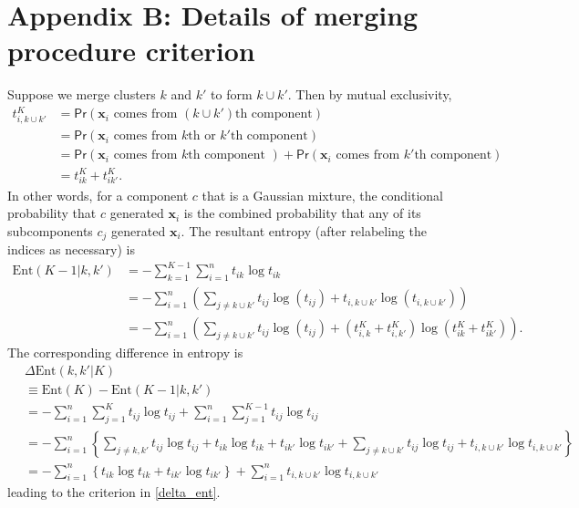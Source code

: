 \documentclass{uwstat572}
\newcommand*\ba{\[ \begin{aligned}}
\newcommand*\ea{\end{aligned} \]}
\newcommand*\bx{\mathbf{x}}
\renewcommand\;{\,}
\renewcommand\Pr[1]{ \mathsf{Pr}\left(#1\right) }
\begin{document}
\section*{Appendix B: Details of merging procedure criterion}
Suppose we merge clusters $k$ and $k'$ to form $k \cup k'$. Then by mutual exclusivity,
\ba
t_{i, k \cup k'}^K
	& = \Pr{\bx_i \text{ comes from $(k \cup k')$th component}} \\
	& = \Pr{\bx_i \text{ comes from $k$th or $k'$th component} } \\
	& = \Pr{\bx_i \text{ comes from $k$th component }} + \Pr{\bx_i \text{ comes from $k'$th component} } \\
	& = t_{ik}^K + t_{ik'}^K.
\ea
In other words, for a component $c$ that is a Gaussian mixture, the conditional probability that $c$ generated $\bx_i$ is the combined probability that any of its subcomponents $c_j$ generated $\bx_i$.
The resultant entropy (after relabeling the indices as necessary) is
\ba
\text{Ent}(K - 1|k, k') & = - \sum_{k=1}^{K - 1} \sum_{i=1}^n t_{ik} \log t_{ik} \\
	& = - \sum_{i=1}^n \left( \sum_{j \ne k \cup k'} t_{ij} \log(t_{ij}) + t_{i,k \cup k'} \log( t_{i,k\cup k'} ) \right) \\
	& = - \sum_{i=1}^n \left( \sum_{j \ne k \cup k'} t_{ij} \log(t_{ij}) + (t_{i,k}^K + t_{i,k'}^K) \log( t_{ik}^K + t_{ik'}^K) \right).
\ea
The corresponding difference in entropy is
\ba
\; & \Delta\text{Ent}(k, k' | K) \\
	& \equiv \text{Ent}(K) - \text{Ent}(K - 1|k, k') \\
	& = -  \sum_{i=1}^n \sum_{j=1}^K t_{ij} \log t_{ij} + \sum_{i=1}^n \sum_{j=1}^{K - 1} t_{ij} \log t_{ij} \\
	& = - \sum_{i=1}^n \left\{
			\sum_{j \ne k, k'} t_{ij} \log t_{ij}
			+ t_{ik} \log t_{ik} + t_{ik'} \log t_{ik'}
			+ \sum_{j \ne k \cup k'} t_{ij} \log t_{ij}
			+ t_{i, k\cup k'} \log t_{i, k \cup k'}
		\right\} \\
	& = - \sum_{i=1}^n \left\{ t_{ik} \log t_{ik} + t_{ik'} \log t_{ik'} \right\}
		+ \sum_{i=1}^n t_{i,k\cup k'} \log t_{i, k \cup k'}
\ea
leading to the criterion in \eqref{delta_ent}.
\end{document}
